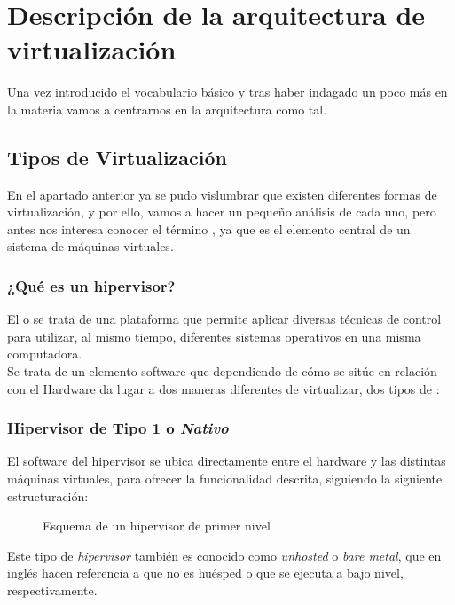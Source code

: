 \chapter{Descripción de la arquitectura de virtualización}

\lettrine[lines=1,slope=4pt,findent=0pt]{U}{}na vez introducido el vocabulario básico y tras haber indagado un poco más en la materia vamos a centrarnos en la arquitectura como tal.\\

\section{Tipos de Virtualización}
En el apartado anterior ya se pudo vislumbrar que existen diferentes formas de virtualización, y por ello, vamos a hacer un pequeño análisis de cada uno, pero antes nos interesa conocer el término \emph{}, ya que es el elemento central de un sistema de máquinas virtuales.

\subsection{¿Qué es un hipervisor?}
El \emph{} o \emph{} se trata de una plataforma que permite aplicar diversas técnicas de control para utilizar, al mismo tiempo, diferentes sistemas operativos en una misma computadora.\\

Se trata de un elemento software que dependiendo de cómo se sitúe en relación con el Hardware da lugar a dos maneras diferentes de virtualizar, dos tipos de \emph{}\cite{tipoship}:

\subsection{Hipervisor de Tipo 1 o \emph{Nativo}}
 El software del hipervisor se ubica directamente entre el hardware y las distintas máquinas virtuales, para ofrecer la funcionalidad descrita, siguiendo la siguiente estructuración:

\begin{figure}[H]
\begin{center}
\end{center}
\caption[Hipervisor Tipo 1]{Esquema de un hipervisor de primer nivel}
\end{figure}

Este tipo de \emph{hipervisor} también es conocido como \emph{unhosted} o \emph{bare metal}, que en inglés hacen referencia a que no es huésped o que se ejecuta a bajo nivel, respectivamente.\\


